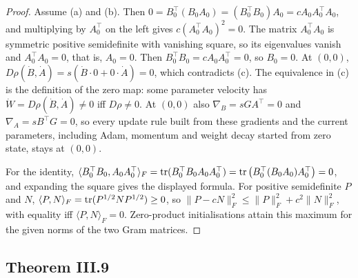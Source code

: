 \begin{proof}
Assume (a) and (b). Then $0=B_0^\top(B_0A_0)=(B_0^\top B_0)A_0=cA_0A_0^\top A_0$, and multiplying by $A_0^\top$ on the left
gives $c(A_0^\top A_0)^2=0$. The matrix $A_0^\top A_0$ is symmetric positive semidefinite with vanishing square, so its
eigenvalues vanish and $A_0^\top A_0=0$, that is, $A_0=0$. Then $B_0^\top B_0=cA_0A_0^\top=0$, so $B_0=0$. At $(0,0)$,
$D\rho(\dot B,\dot A)=s(\dot B\cdot0+0\cdot\dot A)=0$, which contradicts (c). The equivalence in (c) is the definition of
the zero map: some parameter velocity has $\dot W=D\rho(\dot B,\dot A)\ne0$ iff $D\rho\ne0$. At $(0,0)$ also
$\nabla_B=sGA^\top=0$ and $\nabla_A=sB^\top G=0$, so every update rule built from these gradients and the current
parameters, including Adam, momentum and weight decay started from zero state, stays at $(0,0)$.

For the identity, $\langle B_0^\top B_0,A_0A_0^\top\rangle_F=\operatorname{tr}(B_0^\top B_0A_0A_0^\top)=\operatorname{tr}\big(B_0^\top(B_0A_0)A_0^\top\big)=0$,
and expanding the square gives the displayed formula. For positive semidefinite $P$ and $N$,
$\langle P,N\rangle_F=\operatorname{tr}(P^{1/2}NP^{1/2})\ge0$, so $\lVert P-cN\rVert_F^2\le\lVert P\rVert_F^2+c^2\lVert N\rVert_F^2$, with
equality iff $\langle P,N\rangle_F=0$. Zero-product initialisations attain this maximum for the given norms of the two
Gram matrices.
\end{proof}

\subsection{Theorem III.9}\label{proof:III.9}

